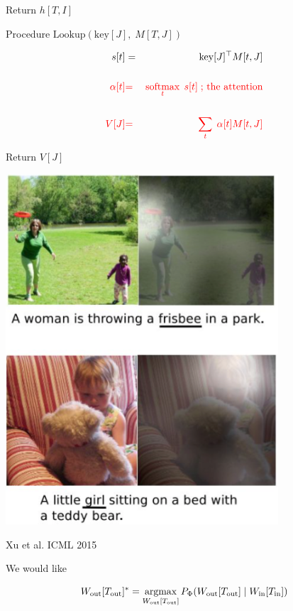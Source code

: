{Return $h[T,I]$


Procedure $\mathrm{Lookup}(\mathrm{key}[J],\;M[T,J])$

\bigskip
\begin{eqnarray*}
s[t] & = &\mathrm{key}[J]^\top M[t,J] \\
\\
{\color{red} \alpha[t]} & {\color{red} =} & {\color{red} \operatorname*{softmax}_t \;s[t]\;\mbox{; the attention}} \\
\\
{\color{red} V[J]} & {\color{red} =} & {\color{red} \sum_t\;\alpha[t]M[t,J]}
\end{eqnarray*}

\bigskip
Return $V[J]$




\centerline{\includegraphics[width = 4in]{../images/AttentionInCaptioning1}}
\centerline{Xu et al. ICML 2015}


We would like

\vfill
$$W_{\mathrm{out}}[T_{\mathrm{out}}]^* = \operatorname*{argmax}_{W_{\mathrm{out}}[T_{\mathrm{out}}]}
P_\Phi(W_{\mathrm{out}}[T_{\mathrm{out}}] \;|\;W_{\mathrm{in}}[T_{\mathrm{in}}])$$

}
